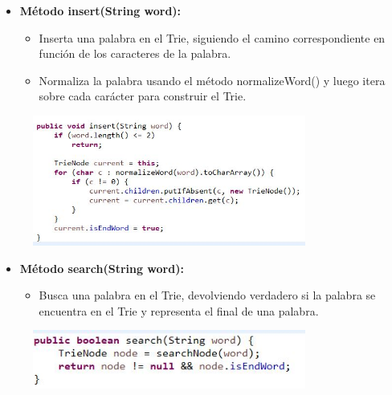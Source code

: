 \documentclass{article}
\begin{document}
	\begin{itemize}
	\item \textbf{Método insert(String word):}
	 \begin{itemize}
	 \item Inserta una palabra en el Trie, siguiendo el camino correspondiente en función de los caracteres de la palabra.
	 \item Normaliza la palabra usando el método normalizeWord() y luego itera sobre cada carácter para construir el Trie.
	 \end{itemize}
	\end{itemize}
	 \begin{figure}[H]
		\centering
		\includegraphics[width=0.8\textwidth,keepaspectratio]{img/TN2.jpg}
	\end{figure}
	
	\begin{itemize}
	\item \textbf{Método search(String word):}
	 \begin{itemize}
	 \item Busca una palabra en el Trie, devolviendo verdadero si la palabra se encuentra en el Trie y representa el final de una palabra.
	 \end{itemize}
	\end{itemize}
	 \begin{figure}[H]
		\centering
		\includegraphics[width=0.8\textwidth,keepaspectratio]{img/TN3.jpg}
	\end{figure}
	\clearpage
	
\end{document}
